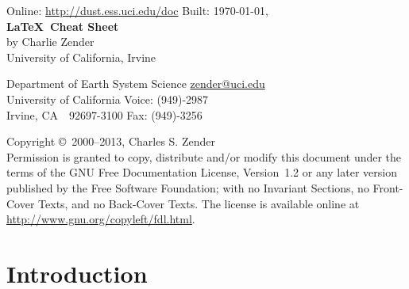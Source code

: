 \documentclass[12pt]{article}
\begin{document}

\ifpdf %
\fi %

\begin{center}
Online: \url{http://dust.ess.uci.edu/doc} \hfill Built: \shortdate\today, \xxivtime\\
\bigskip
{\Large \textbf{\LaTeX\ Cheat Sheet}}\\
\bigskip
by Charlie Zender\\
University of California, Irvine\\
\end{center}
Department of Earth System Science \hfill \url{zender@uci.edu}\\
University of California \hfill Voice: (949)-2987\\
Irvine, CA~~92697-3100 \hfill Fax: (949)-3256

\bigskip\noindent
Copyright \copyright\ 2000--2013, Charles S. Zender\\
Permission is granted to copy, distribute and/or modify this document
under the terms of the GNU Free Documentation License, Version~1.2
or any later version published by the Free Software Foundation;
with no Invariant Sections, no Front-Cover Texts, and no Back-Cover
Texts.
The license is available online at
\url{http://www.gnu.org/copyleft/fdl.html}.

\setcounter{page}{1}
\pagestyle{headings}
\thispagestyle{empty}
\tableofcontents
\listoffigures
\listoftables
{}
\setcounter{page}{1}
\thispagestyle{empty}

\section{Introduction}\label{sxn:ntr}
\end{document}
